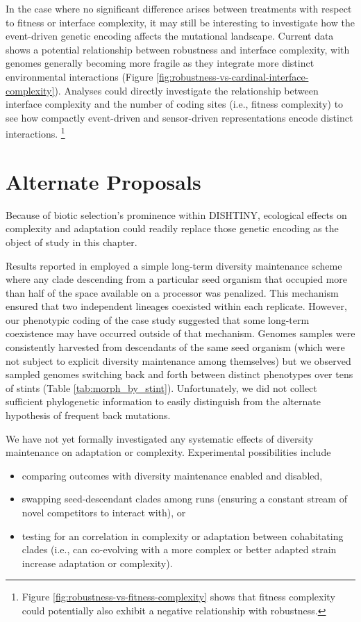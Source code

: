 


In the case where no significant difference arises between treatments with respect to fitness or interface complexity, it may still be interesting to investigate how the event-driven genetic encoding affects the mutational landscape.
Current data shows a potential relationship between robustness and interface complexity, with genomes generally becoming more fragile as they integrate more distinct environmental interactions (Figure \ref{fig:robustness-vs-cardinal-interface-complexity}).
Analyses could directly investigate the relationship between interface complexity and the number of coding sites (i.e., fitness complexity) to see how compactly event-driven and sensor-driven representations encode distinct interactions.%
\footnote{%
Figure \ref{fig:robustness-vs-fitness-complexity} shows that fitness complexity could potentially also exhibit a negative relationship with robustness.
}

\section{Alternate Proposals}

Because of biotic selection's prominence within DISHTINY, ecological effects on complexity and adaptation could readily replace those genetic encoding as the object of study in this chapter.

Results reported in \citep{moreno2021case} employed a simple long-term diversity maintenance scheme where any clade descending from a particular seed organism that occupied more than half of the space available on a processor was penalized.
This mechanism ensured that two independent lineages coexisted within each replicate.
However, our phenotypic coding of the case study suggested that some long-term coexistence may have occurred outside of that mechanism.
Genomes samples were consistently harvested from descendants of the same seed organism (which were not subject to explicit diversity maintenance among themselves) but we observed sampled genomes switching back and forth between distinct phenotypes over tens of stints (Table \ref{tab:morph_by_stint}).
Unfortunately, we did not collect sufficient phylogenetic information to easily distinguish from the alternate hypothesis of frequent back mutations.

We have not yet formally investigated any systematic effects of diversity maintenance on adaptation or complexity.
Experimental possibilities include
\begin{itemize}
\item comparing outcomes with diversity maintenance enabled and disabled,
\item swapping seed-descendant clades among runs (ensuring a constant stream of novel competitors to interact with), or
\item testing for an correlation in complexity or adaptation between cohabitating clades (i.e., can co-evolving with a more complex or better adapted strain increase adaptation or complexity).
\end{itemize}

